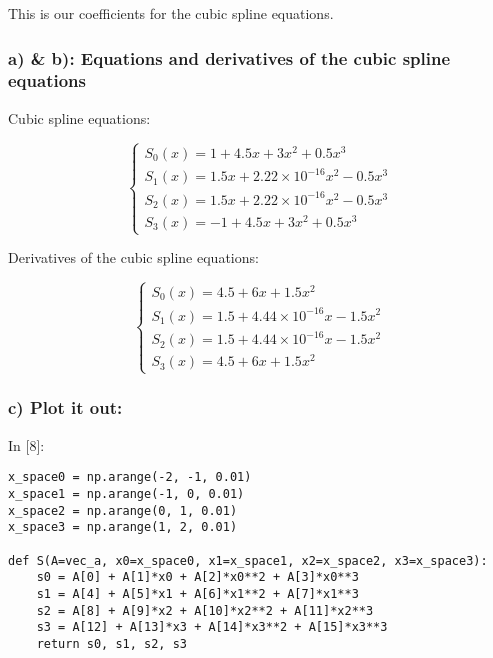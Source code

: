 \documentclass[11pt]{article}
\newif\ifcode
\newif\ifleftmargins
\newlength{\promptlength}
\newcommand{\prompt}[3]{
        \needspace{1.1cm}
        \settowidth{\promptlength}{ #1 [#3] }
        \ifleftmargins\hspace{-\promptlength}\hspace{-5pt}\fi
        {\color{#2}#1 [#3]:}
        \ifleftmargins\vspace{-2.7ex}\fi
    }
\begin{document}
    This is our coefficients for the cubic spline equations.

    \hypertarget{a-b-equations-and-derivatives-of-the-cubic-spline-equations}{%
\subsubsection{a) \& b): Equations and derivatives of the cubic spline
equations}\label{a-b-equations-and-derivatives-of-the-cubic-spline-equations}}

Cubic spline equations:

\[\left\{ \begin{array}{ll}
            S_0(x) = 1 + 4.5 x + 3 x^2 + 0.5 x^3 \\
            S_1(x) = 1.5 x + 2.22 \times 10^{-16} x^2 - 0.5 x^3 \\
            S_2(x) = 1.5 x + 2.22 \times 10^{-16} x^2 - 0.5 x^3 \\
            S_3(x) = -1 + 4.5 x + 3 x^2 + 0.5 x^3
            \end{array} \right.\]

    Derivatives of the cubic spline equations:

\[\left\{ \begin{array}{ll}
            S_0(x) = 4.5 + 6 x + 1.5 x^2 \\
            S_1(x) = 1.5 + 4.44 \times 10^{-16} x - 1.5 x^2 \\
            S_2(x) = 1.5 + 4.44 \times 10^{-16} x - 1.5 x^2 \\
            S_3(x) = 4.5 + 6 x + 1.5 x^2
            \end{array} \right.\]

    \hypertarget{c-plot-it-out}{%
\subsubsection{c) Plot it out:}\label{c-plot-it-out}}

    
\prompt{In}{incolor}{8}
\codetrue
\begin{tcolorbox}[breakable, size=fbox, boxrule=1pt, pad at break*=1mm, colback=cellbackground, colframe=cellborder]
\begin{verbatim}
x_space0 = np.arange(-2, -1, 0.01)
x_space1 = np.arange(-1, 0, 0.01)
x_space2 = np.arange(0, 1, 0.01)
x_space3 = np.arange(1, 2, 0.01)

def S(A=vec_a, x0=x_space0, x1=x_space1, x2=x_space2, x3=x_space3):
    s0 = A[0] + A[1]*x0 + A[2]*x0**2 + A[3]*x0**3
    s1 = A[4] + A[5]*x1 + A[6]*x1**2 + A[7]*x1**3
    s2 = A[8] + A[9]*x2 + A[10]*x2**2 + A[11]*x2**3
    s3 = A[12] + A[13]*x3 + A[14]*x3**2 + A[15]*x3**3
    return s0, s1, s2, s3
\end{verbatim}
\end{tcolorbox}
\codefalse
\end{document}
